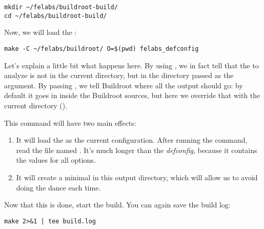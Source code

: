 \begin{verbatim}
mkdir ~/felabs/buildroot-build/
cd ~/felabs/buildroot-build/
\end{verbatim}

Now, we will load the :

\begin{verbatim}
make -C ~/felabs/buildroot/ O=$(pwd) felabs_defconfig
\end{verbatim}

Let's explain a little bit what happens here. By using
, we in fact tell  that the
 to analyze is not in the current directory, but in the
directory passed as the  argument. By passing , we
tell Buildroot where all the output should go: by default it goes in
 inside the Buildroot sources, but here we override that
with the current directory ().

This command will have two main effects:

\begin{enumerate}

\item It will load the  as the current
  configuration. After running the command, read the file named
  . It's much longer than the {\em defconfig}, because
  it contains the values for all options.

\item It will create a minimal  in this output
  directory, which will allow us to avoid doing the  dance each time.

\end{enumerate}

Now that this is done, start the build. You can again save the build
log:

\begin{verbatim}
make 2>&1 | tee build.log
\end{verbatim}
